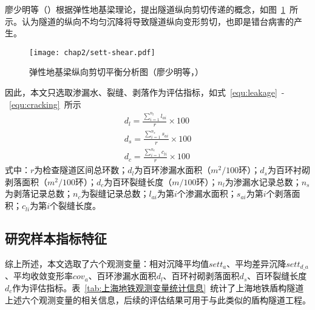廖少明等（\citeyear{廖少明2005隧道纵向剪切传递效应及其一维解析}）根据弹性地基梁理论，提出隧道纵向剪切传递的概念，如图~\ref{fig:弹性地基梁纵向剪切平衡分析图}~所示。认为隧道的纵向不均匀沉降将导致隧道纵向变形剪切，也即是错台病害的产生。

\begin{figure}[htbp]
    \centering
    \texttt{[image: chap2/sett-shear.pdf]}
    \caption{弹性地基梁纵向剪切平衡分析图（廖少明等，\citeyear{廖少明2005隧道纵向剪切传递效应及其一维解析}）}
    \label{fig:弹性地基梁纵向剪切平衡分析图}
\end{figure}

因此，本文只选取渗漏水、裂缝、剥落作为评估指标，如式~\ref{equ:leakage}~-~\ref{equ:cracking}~所示
\begin{align}
    \label{equ:leakage}
    {{d}_{l}}=\frac{\sum\limits_{i=1}^{{{n}_{l}}}{{{l}_{ai}}}}{r}\times 100 \\
    \label{equ:spalling}
    {{d}_{s}}=\frac{\sum\limits_{i=1}^{{{n}_{s}}}{{{s}_{ai}}}}{r}\times 100 \\
    \label{equ:cracking}
    {{d}_{c}}=\frac{\sum\limits_{i=1}^{{{n}_{c}}}{{{c}_{li}}}}{r}\times 100
\end{align}
式中：$r$为检查隧道区间总环数；${d}_{l}$为百环渗漏水面积（$m^2/100$环）；${d}_{s}$为百环衬砌剥落面积（$m^2/100$环）；${d}_{c}$为百环裂缝长度（$m/100$环）；${n}_{l}$为渗漏水记录总数；${n}_{s}$为剥落记录总数；${n}_{c}$为裂缝记录总数；${l}_{ai}$为第$i$个渗漏水面积；${s}_{ai}$为第$i$个剥落面积；${c}_{li}$为第$i$个裂缝长度。
\subsection{研究样本指标特征}

综上所述，本文选取了六个观测变量：相对沉降平均值${sett}_{a}$、平均差异沉降$set{{t}_{d\_a}}$、平均收敛变形率${cov}_{a}$、百环渗漏水面积${d}_{l}$、百环衬砌剥落面积${d}_{s}$、百环裂缝长度${d}_{c}$作为评估指标。表~\ref{tab:上海地铁观测变量统计信息}~统计了上海地铁盾构隧道上述六个观测变量的相关信息，后续的评估结果可用于与此类似的盾构隧道工程。

